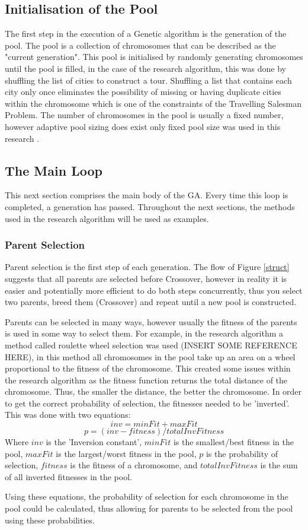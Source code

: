 \subsection{Initialisation of the Pool}
\par
The first step in the execution of a Genetic algorithm is the generation of the pool. The pool is a collection of chromosomes that can be described as the "current generation". This pool is initialised by randomly generating chromosomes until the pool is filled, in the case of the research algorithm, this was done by shuffling the list of cities to construct a tour. Shuffling a list that contains each city only once eliminates the possibility of missing or having duplicate cities within the chromosome which is one of the constraints of the Travelling Salesman Problem. The number of chromosomes in the pool is usually a fixed number, however adaptive pool sizing does exist only fixed pool size was used in this research \cite{populationsize}. 
\subsection{The Main Loop}
\par
This next section comprises the main body of the GA. Every time this loop is completed, a generation has passed. Throughout the next sections, the methods used in the research algorithm will be used as examples.
\subsubsection{Parent Selection}\label{parents}
\par
Parent selection is the first step of each generation. The flow of Figure \ref{struct} suggests that all parents are selected before Crossover, however in reality it is easier and potentially more efficient to do both steps concurrently, thus you select two parents, breed them (Crossover) and repeat until a new pool is constructed.
\par
Parents can be selected in many ways, however usually the fitness of the parents is used in some way to select them. For example, in the research algorithm a method called roulette wheel selection was used (INSERT SOME REFERENCE HERE), in this method all chromosomes in the pool take up an area on a wheel proportional to the fitness of the chromosome. This created some issues within the research algorithm as the fitness function returns the total distance of the chromosome. Thus, the smaller the distance, the better the chromosome. In order to get the correct probability of selection, the fitnesses needed to be 'inverted'. This was done with two equations: 
\[ inv = minFit + maxFit\]
\[ p = (inv - fitness)/totalInvFitness\]
Where $inv$ is the 'Inversion constant', $minFit$ is the smallest/best fitness in the pool, $maxFit$ is the largest/worst fitness in the pool, $p$ is the probability of selection, $fitness$ is the fitness of a chromosome, and $totalInvFitness$ is the sum of all inverted fitnesses in the pool.
\par
Using these equations, the probability of selection for each chromosome in the pool could be calculated, thus allowing for parents to be selected from the pool using these probabilities.
